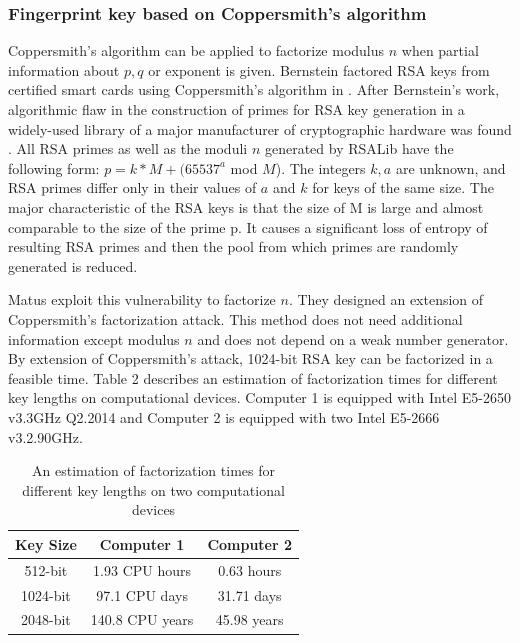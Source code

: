 \documentclass[a4paper]{article}
\begin{document}
\subsubsection*{\textbf{Fingerprint key based on Coppersmith's algorithm}}

Coppersmith's algorithm can be applied to factorize modulus $n$ when partial information about $p,q$ or exponent is given. Bernstein factored RSA keys from certified smart cards using Coppersmith's algorithm in \cite{}.
After Bernstein's work, algorithmic flaw in the construction of primes for RSA key generation in a widely-used library of a major manufacturer of cryptographic hardware was found \cite{}. All RSA primes as well as the moduli $n$ generated by RSALib have the	following form: $p=k*M + (65537^a$ mod $M$). The integers $k,a$ are unknown, and RSA primes differ only in their values of $a$ and $k$ for keys of the same size. The major characteristic of the RSA keys is that the size of M is large and almost comparable to the size of the prime p. It causes a significant loss of entropy of resulting RSA primes and then the pool from which primes are randomly generated is reduced. 
       
Matus exploit this vulnerability to factorize $n$. They designed an extension of Coppersmith's factorization attack. This method does not need additional information except modulus $n$ and does not depend on a weak number generator. By extension of Coppersmith's attack, 1024-bit RSA key can be factorized in a feasible time. Table 2 describes an estimation of factorization times for different key lengths on computational devices. Computer 1 is equipped with Intel E5-2650 v3.3GHz Q2.2014 and Computer 2 is equipped with two Intel E5-2666 v3.2.90GHz.

\begin{table}[h]
\centering
\label{my-label}
\begin{tabular}{|c|c|c|}
\hline
Key Size & Computer 1 & Computer 2 \\ \hline
512-bit  & 1.93 CPU hours                                   & 0.63 hours                                                        \\ \hline
1024-bit & 97.1 CPU days                                    & 31.71 days                                                        \\ \hline
2048-bit & 140.8 CPU years                                  & 45.98 years                                                       \\ \hline
\end{tabular}
\caption{An estimation of factorization times for different key lengths on two computational devices \cite{}}
\end{table}
\end{document}
